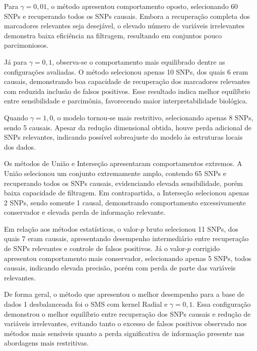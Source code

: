 \documentclass[12pt,a4paper]{article}
\begin{document}
Para $\gamma = 0{,}01$, o método apresentou comportamento oposto, selecionando 60 SNPs e recuperando todos os SNPs causais. Embora a recuperação completa dos marcadores relevantes seja desejável, o elevado número de variáveis irrelevantes demonstra baixa eficiência na filtragem, resultando em conjuntos pouco parcimoniosos.

Já para $\gamma = 0{,}1$, observa-se o comportamento mais equilibrado dentre as configurações avaliadas. O método selecionou apenas 10 SNPs, dos quais 6 eram causais, demonstrando boa capacidade de recuperação dos marcadores relevantes com reduzida inclusão de falsos positivos. Esse resultado indica melhor equilíbrio entre sensibilidade e parcimônia, favorecendo maior interpretabilidade biológica.

Quando $\gamma = 1{,}0$, o modelo tornou-se mais restritivo, selecionando apenas 8 SNPs, sendo 5 causais. Apesar da redução dimensional obtida, houve perda adicional de SNPs relevantes, indicando possível sobreajuste do modelo às estruturas locais dos dados.

Os métodos de União e Interseção apresentaram comportamentos extremos. A União selecionou um conjunto extremamente amplo, contendo 65 SNPs e recuperando todos os SNPs causais, evidenciando elevada sensibilidade, porém baixa capacidade de filtragem. Em contrapartida, a Interseção selecionou apenas 2 SNPs, sendo somente 1 causal, demonstrando comportamento excessivamente conservador e elevada perda de informação relevante.

Em relação aos métodos estatísticos, o valor-$p$ bruto selecionou 11 SNPs, dos quais 7 eram causais, apresentando desempenho intermediário entre recuperação de SNPs relevantes e controle de falsos positivos. Já o valor-$p$ corrigido apresentou comportamento mais conservador, selecionando apenas 5 SNPs, todos causais, indicando elevada precisão, porém com perda de parte das variáveis relevantes.

De forma geral, o método que apresentou o melhor desempenho para a base de dados 1 desbalanceada foi o SMS com kernel Radial e $\gamma = 0{,}1$. Essa configuração demonstrou o melhor equilíbrio entre recuperação dos SNPs causais e redução de variáveis irrelevantes, evitando tanto o excesso de falsos positivos observado nos métodos mais sensíveis quanto a perda significativa de informação presente nas abordagens mais restritivas.
\end{document}
